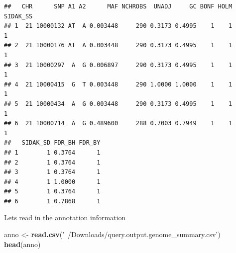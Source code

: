 \documentclass[
]{article}
\newenvironment{Shaded}{\begin{snugshade}}{\end{snugshade}}
\newcommand{\KeywordTok}[1]{\textcolor[rgb]{0.13,0.29,0.53}{\textbf{#1}}}
\newcommand{\NormalTok}[1]{#1}
\newcommand{\StringTok}[1]{\textcolor[rgb]{0.31,0.60,0.02}{#1}}
\begin{document}
\begin{verbatim}
##   CHR      SNP A1 A2      MAF NCHROBS  UNADJ     GC BONF HOLM SIDAK_SS
## 1  21 10000132 AT  A 0.003448     290 0.3173 0.4995    1    1        1
## 2  21 10000176 AT  A 0.003448     290 0.3173 0.4995    1    1        1
## 3  21 10000297  A  G 0.006897     290 0.3173 0.4995    1    1        1
## 4  21 10000415  G  T 0.003448     290 1.0000 1.0000    1    1        1
## 5  21 10000434  A  G 0.003448     290 0.3173 0.4995    1    1        1
## 6  21 10000714  A  G 0.489600     288 0.7003 0.7949    1    1        1
##   SIDAK_SD FDR_BH FDR_BY
## 1        1 0.3764      1
## 2        1 0.3764      1
## 3        1 0.3764      1
## 4        1 1.0000      1
## 5        1 0.3764      1
## 6        1 0.7868      1
\end{verbatim}

Lets read in the annotation information

\begin{Shaded}
\begin{Highlighting}[]
\NormalTok{anno <-}\StringTok{ }\KeywordTok{read.csv}\NormalTok{(}\StringTok{'~/Downloads/query.output.genome_summary.csv'}\NormalTok{)}
\KeywordTok{head}\NormalTok{(anno)}
\end{Highlighting}
\end{Shaded}
\end{document}

